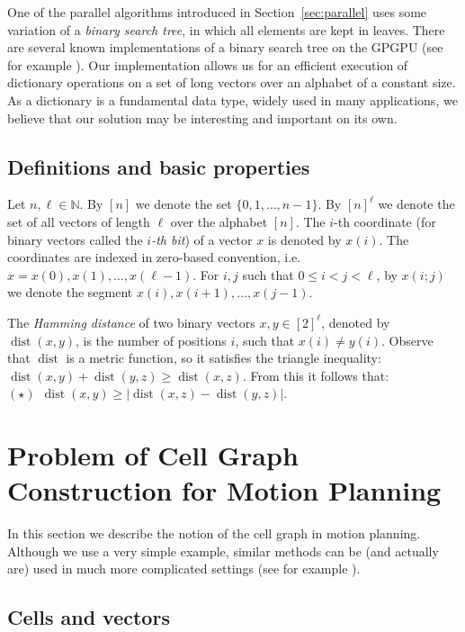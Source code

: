 \documentclass[a4paper]{article}
\DeclareMathOperator{\dist}{dist}
\begin{document}
One of the parallel algorithms introduced in Section~\ref{sec:parallel} uses some variation of a \textit{binary search tree}, in which all elements are kept in leaves. There are several known implementations of a binary search tree on the GPGPU (see for example \cite{Kim:2010:FFA:1807167.1807206}). 
Our implementation allows us for an efficient execution of dictionary operations on a set of long vectors over an alphabet of a constant size. 
As a dictionary is a fundamental data type, widely used in many applications, we believe that our solution may be interesting and important on its own.




\subsection{Definitions and basic properties}
Let $n, \ell \in \mathbb{N}$. By $[n]$ we denote the set $\{0,1,\ldots,n-1\}$. 
By $[n]^\ell$ we denote the set of all vectors of length $\ell$ over the alphabet $[n]$. The $i$-th coordinate (for binary vectors called the {\em $i$-th bit}) of a vector $x$ is denoted by $x(i)$. The coordinates are indexed in zero-based convention, i.e. $x = x(0),x(1),\ldots,x(\ell-1)$. For $i,j$ such that $0 \leq i < j < \ell$, by $x(i;j)$ we denote the segment $x(i),x(i+1),\ldots,x(j-1)$. 

The {\em Hamming distance} of two binary vectors $x,y \in [2]^\ell$, denoted by $\dist(x,y)$, is the number of positions $i$, such that $x(i) \neq y(i)$. Observe that $\dist$ is a metric function, so it satisfies the triangle inequality: $\dist(x,y) + \dist(y,z) \geq \dist(x,z)$.
From this it follows that: $(\star)~~\dist(x,y) \geq |\dist(x,z) - \dist(y,z)|$.


\section{Problem of Cell Graph Construction for Motion Planning} 
\label{sec:motivation}

In this section we describe the notion of the cell graph in motion planning. Although we use a very simple example, similar methods can be (and actually are) used in much more complicated settings (see for example \cite{Canny, Hwang}).

\subsection{Cells and vectors}
\end{document}
